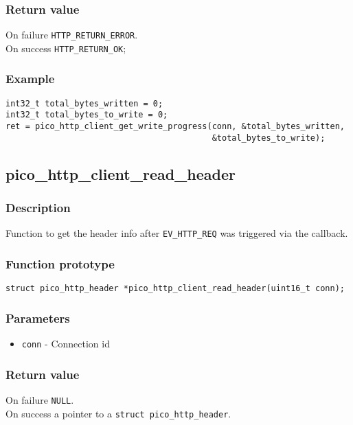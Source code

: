 \subsubsection*{Return value}
On failure \texttt{HTTP\_RETURN\_ERROR}.
\\On success \texttt{HTTP\_RETURN\_OK};
\subsubsection*{Example}
\begin{verbatim}
int32_t total_bytes_written = 0;
int32_t total_bytes_to_write = 0;
ret = pico_http_client_get_write_progress(conn, &total_bytes_written,
                                          &total_bytes_to_write);
\end{verbatim}


\subsection{pico\_http\_client\_read\_header}

\subsubsection*{Description}
Function to get the header info after \texttt{EV\_HTTP\_REQ} was triggered via the callback.

\subsubsection*{Function prototype}
\texttt{struct pico\_http\_header *pico\_http\_client\_read\_header(uint16\_t conn);}

\subsubsection*{Parameters}
\begin{itemize}[noitemsep]
\item \texttt{conn} - Connection id
\end{itemize}

\subsubsection*{Return value}
On failure \texttt{NULL}.
\\On success a pointer to a \texttt{struct pico\_http\_header}.

